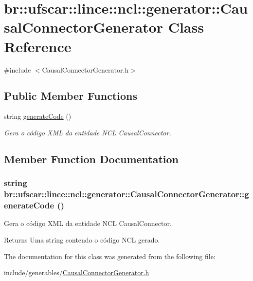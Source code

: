 \hypertarget{classbr_1_1ufscar_1_1lince_1_1ncl_1_1generator_1_1CausalConnectorGenerator}{
\section{br::ufscar::lince::ncl::generator::CausalConnectorGenerator Class Reference}
\label{classbr_1_1ufscar_1_1lince_1_1ncl_1_1generator_1_1CausalConnectorGenerator}
}


{\ttfamily \#include $<$CausalConnectorGenerator.h$>$}

\subsection*{Public Member Functions}
\begin{DoxyCompactItemize}
\item 
string \hyperlink{classbr_1_1ufscar_1_1lince_1_1ncl_1_1generator_1_1CausalConnectorGenerator_a4ef6cc0f6f82025ee8cb489861014251}{generateCode} ()
\begin{DoxyCompactList}\small\item\em Gera o código XML da entidade NCL CausalConnector. \item\end{DoxyCompactList}\end{DoxyCompactItemize}


\subsection{Member Function Documentation}
\hypertarget{classbr_1_1ufscar_1_1lince_1_1ncl_1_1generator_1_1CausalConnectorGenerator_a4ef6cc0f6f82025ee8cb489861014251}{
\subsubsection[{generateCode}]{\setlength{\rightskip}{0pt plus 5cm}string br::ufscar::lince::ncl::generator::CausalConnectorGenerator::generateCode ()}}
\label{classbr_1_1ufscar_1_1lince_1_1ncl_1_1generator_1_1CausalConnectorGenerator_a4ef6cc0f6f82025ee8cb489861014251}


Gera o código XML da entidade NCL CausalConnector. 

\begin{DoxyReturn}{Returns}
Uma string contendo o código NCL gerado. 
\end{DoxyReturn}


The documentation for this class was generated from the following file:\begin{DoxyCompactItemize}
\item 
include/generables/\hyperlink{CausalConnectorGenerator_8h}{CausalConnectorGenerator.h}\end{DoxyCompactItemize}
